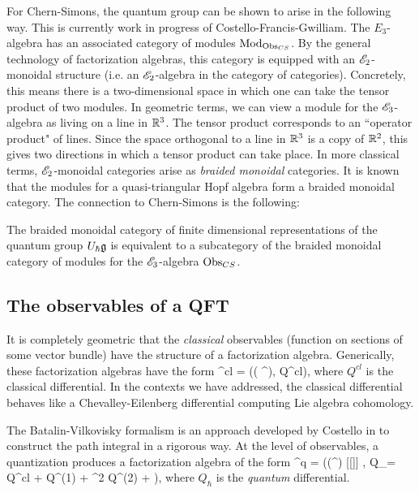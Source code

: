 \documentclass[10pt]{amsart}
\begin{document}
For Chern-Simons, the quantum group can be shown to arise in the following way. 
This is currently work in progress of Costello-Francis-Gwilliam. 
The $E_3$-algebra has an associated category of modules ${\rm Mod}_{{\rm Obs}_{CS}}$. 
By the general technology of factorization algebras, this category is equipped with an $\mathscr E_2$-monoidal structure (i.e. an $\mathscr E_2$-algebra in the category of categories). 
Concretely, this means there is a two-dimensional space in which one can take the tensor product of two modules. 
In geometric terms, we can view a module for the $\mathscr E_3$-algebra as living on a line in $\mathbb R^3$.
The tensor product corresponds to an ``operator product" of lines.
Since the space orthogonal to a line in $\mathbb R^3$ is a copy of $\mathbb R^2$, this gives two directions in which a tensor product can take place. 
In more classical terms, $\mathscr E_2$-monoidal categories arise as {\em braided monoidal} categories. 
It is known that the modules for a quasi-triangular Hopf algebra form a braided monoidal category. 
The connection to Chern-Simons is the following:

\begin{thm}
The braided monoidal category of finite dimensional representations of the quantum group $U_{\hbar} \mathfrak g$ is equivalent to a subcategory of the braided monoidal category of modules for the $\mathscr E_3$-algebra ${\rm Obs}_{CS}$. 
\end{thm}

\subsection{The observables of a QFT}

It is completely geometric that the {\em classical} observables (function on sections of some vector bundle) have the structure of a factorization algebra. 
Generically, these factorization algebras have the form
\ben
\Obs^{cl} = \left(\Sym( \sE^\vee), Q^{cl}\right),
\een
where $Q^{cl}$ is the classical differential. 
In the contexts we have addressed, the classical differential behaves like a Chevalley-Eilenberg differential computing Lie algebra cohomology. 

The Batalin-Vilkovisky formalism is an approach developed by Costello in \cite{CosBook} to construct the path integral in a rigorous way.
At the level of observables, a quantization produces a factorization algebra of the form
\ben
\Obs^q = \left(\Sym(\sE^\vee) [[\hbar]] , Q_\hbar = Q^{cl} + \hbar Q^{(1)} + \hbar^2 Q^{(2)} + \cdots\right),
\een
where $Q_\hbar$ is the {\em quantum} differential.
\end{document}
